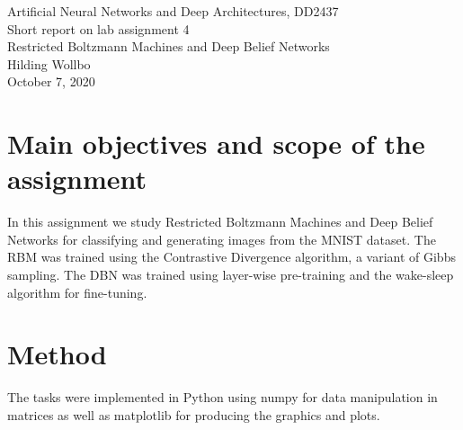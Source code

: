 \documentclass[a4paper]{article}
\begin{document}
\begin{center}
  {\large Artificial Neural Networks and Deep Architectures, DD2437}\\
  \vspace{7mm}
  {\huge Short report on lab assignment 4\\[1ex]}
  {\Large Restricted Boltzmann Machines and Deep Belief Networks}\\
  \vspace{8mm}  
  {\Large Hilding Wollbo\\}
  \vspace{4mm}
  {\large October 7, 2020\\}
\end{center}


\section{Main objectives and scope of the assignment}
In this assignment we study Restricted Boltzmann Machines and Deep Belief Networks for classifying and generating images from the MNIST dataset. The RBM was trained using the Contrastive Divergence algorithm, a variant of Gibbs sampling. The DBN was trained using layer-wise pre-training and the wake-sleep algorithm for fine-tuning.
\section{Method}
The tasks were implemented in Python using numpy for data manipulation in matrices as well as matplotlib for producing the graphics and plots.
\end{document}
